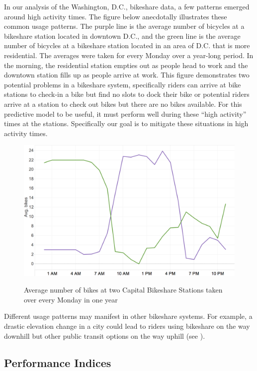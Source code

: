 \documentclass{acm_proc_article-sp}
\begin{document}
In our analysis of the Washington, D.C., bikeshare data, a few patterns emerged around high activity times. The figure below anecdotally illustrates these common usage patterns. The purple line is the average number of bicycles at a bikeshare station located in downtown D.C., and the green line is the average number of bicycles at a bikeshare station located in an area of D.C. that is more residential. The averages were taken for every Monday over a year-long period. In the morning, the residential station empties out as people head to work and the downtown station fills up as people arrive at work. This figure demonstrates two potential problems in a bikeshare system, specifically riders can arrive at bike stations to check-in a bike but find no slots to dock their bike or potential riders arrive at a station to check out bikes but there are no bikes available.  For this predictive model to be useful, it must perform well during these ``high activity'' times at the stations. Specifically our goal is to mitigate these situations in high activity times.

\begin{figure} [!h]
\caption{Average number of bikes at two Capital Bikeshare Stations taken over every Monday in one year}
\centering
\includegraphics[scale = 0.35]{stations_over_time.png}
\label{fig:stations_over_time}
\end{figure}

Different usage patterns may manifest in other bikeshare systems. For example, a drastic elevation change in a city could lead to riders using bikeshare on the way downhill but other public transit options on the way uphill (see \cite{lin:chou}).
\vspace{0.5cm}

\subsection{Performance Indices}
\end{document}
